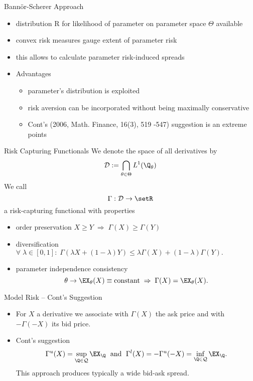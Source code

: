 {Bann{\"o}r-Scherer Approach}
\begin{itemize}
\item<1-> distribution R for likelihood of parameter on parameter space $\Theta$  available
\item<2-> convex risk measures gauge extent of parameter risk
\item<3-> this allows to calculate parameter risk-induced spreads
\item<4-> Advantages
\begin{itemize}
\item  parameter's distribution is exploited
 \item risk aversion can be incorporated without being maximally conservative
\item Cont's (2006, Math. Finance, 16(3), 519 -547) suggestion is an extreme points
\end{itemize}
\end{itemize}

{Risk Capturing Functionals}
We denote the space of all derivatives by
\begin{equation}
{\cal D} := \bigcap_{\theta \in \Theta} L^1(\Q_\theta)
\end{equation}
We call
$$
\Gamma: {\cal D} \rightarrow \setR
$$
a risk-capturing functional with properties
\begin{itemize}
\item<1-> order preservation $X \geq Y \; \Rightarrow \; \Gamma(X) \geq \Gamma(Y)$
\item<2-> diversification $\forall \; \lambda \in [0,1]: \; \Gamma(\lambda X + (1-\lambda) Y) \leq \lambda \Gamma(X) + (1-\lambda) \Gamma(Y).$
\item<3-> parameter independence consistency
$$
\theta \rightarrow \EX_\theta(X) \equiv \mbox{constant} \; \Rightarrow \; \Gamma(X) = \EX_\theta(X).
$$
\end{itemize}

{Model Risk -- Cont's Suggestion}
\begin{itemize}
\item<1-> For $X$ a derivative we associate with
$\Gamma(X)$ the ask price and with $-\Gamma(-X)$ its bid price.
\item<2-> Cont's suggestion
$$
\Gamma^u(X)=\sup_{\Q \in {\cal Q}} \EX_{\Q} \; \mbox{ and } \;
\Gamma^l(X)= -\Gamma^u(-X)=\inf_{\Q \in {\cal Q}} \EX_{\Q}.
$$
This approach produces typically a wide bid-ask spread.
\end{itemize}

